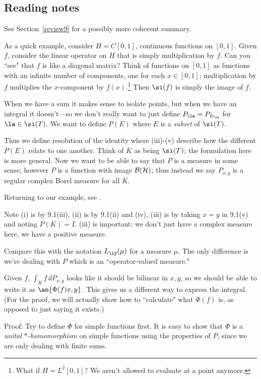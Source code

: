 \subsection{Reading notes}

See Section~\ref{review9} for a possibly more coherent summary.

As a quick example, consider $H=C[0,1]$, %
continuous functions on $[0,1]$. Given $f$, consider the linear operator on $H$ that is simply multiplication by $f$. Can you ``see" that $f$ is like a diagonal matrix? Think of functions on $[0,1]$ as functions with an infinite number of components, one for each $x\in [0,1]$; multiplication by $f$ multiplies the $x$-component by $f(x)$.\footnote{What if $H=L^2[0,1]$? We aren't allowed to evaluate at a point anymore.} Then $\si(f)$ is simply the image of $f$.

When we have a sum it makes sense to isolate points, but when we have an integral it doesn't---so we don't really want to just define $P_{\la}=P_{E_{\la}}$ for $\la\in \si(T)$. We want to define $P(E)$ where $E$ is a {\it subset} of $\si(T)$.

Thus we define resolution of the identity  where (iii)-(v) describe how the different $P(E)$ relate to one another. Think of $K$ as being $\si(T)$; the formulation here is more general. Now we want to be able to say that $P$ is a measure in some sense; however $P$ is a function with image $\cal B(H)$; thus instead we say $P_{x,y}$ is a regular complex Borel measure for all $K$.

Returning to our example, see .

 Note (i) is by 9.1(iii), (ii) is by 9.1(ii) and (iv), (iii) is by taking $x=y$ in 9.1(v) and noting $P(K)=I$.
 (iii) is important: we don't just have a complex measure here, we have a positive measure.

 Compare this with the notation $L_{\iy}(\mu)$ for a measure $\mu$. The only difference is we're dealing with $P$ which is an ``operator-valued measure."

 Given $f$, $\int_K f\,dP_{x,y}$ looks like it should be bilinear in $x,y$, so we should be able to write it as $\an{\Phi(f)x,y}$. This gives us a different way to express the integral. (For the proof, we will actually show how to ``calculate" what $\Phi(f)$ is, as opposed to just saying it exists.)

Proof: Try to define $\Phi$ for simple functions first. It is easy to show that $\Phi$ is a {\it unital $*$-homomorphism} on simple functions using the properties of $P$, since we are only dealing with finite sums.

